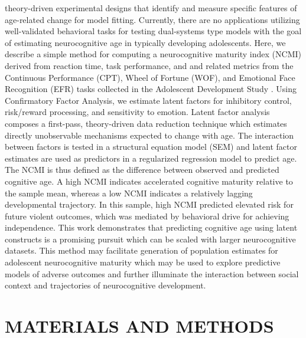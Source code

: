 \documentclass[utf8]{frontiersSCNS} %
\begin{document}
theory-driven experimental designs that identify and measure specific features of age-related change for model fitting. Currently, there are no applications utilizing well-validated behavioral tasks for testing dual-systems type models with the goal of estimating neurocognitive age in typically developing adolescents. Here, we describe a simple method for computing a neurocognitive maturity index (NCMI) derived from reaction time, task performance, and and related metrics from the Continuous Performance (CPT), Wheel of Fortune (WOF), and Emotional Face Recognition (EFR) tasks collected in the Adolescent Development Study \citep{Fishbein2016}. Using Confirmatory Factor Analysis, we estimate latent factors for inhibitory control, risk/reward processing, and sensitivity to emotion. Latent factor analysis composes a first-pass, theory-driven data reduction technique which estimates directly unobservable mechanisms expected to change with age. The interaction between factors is tested in a structural equation model (SEM) and latent factor estimates are used as predictors in a regularized regression model to predict age. The NCMI is thus defined as the difference between observed and predicted cognitive age. A high NCMI indicates accelerated cognitive maturity relative to the sample mean, whereas a low NCMI indicates a relatively lagging developmental trajectory. In this sample, high NCMI predicted elevated risk for future violent outcomes, which was mediated by behavioral drive for achieving independence. This work demonstrates that predicting cognitive age using latent constructs is a promising pursuit which can be scaled with larger neurocognitive datasets. This method may facilitate generation of population estimates for adolescent neurocognitive maturity which may be used to explore predictive models of adverse outcomes and further illuminate the interaction between social context and trajectories of neurocognitive development. 
\section{MATERIALS AND METHODS}
\end{document}
